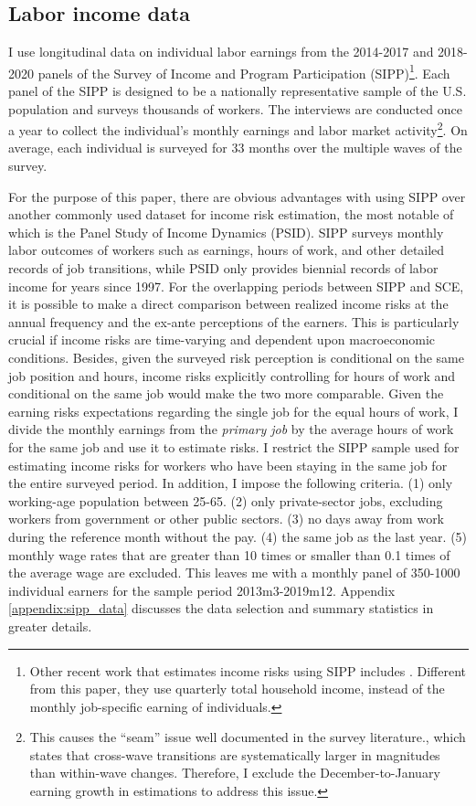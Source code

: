\subsection{Labor income data}

I use longitudinal data on individual labor earnings from the 2014-2017 and 2018-2020 panels of the Survey of Income and Program Participation (SIPP)\footnote{Other recent work that estimates income risks using SIPP includes \cite{bayer2019precautionary}. Different from this paper, they use quarterly total household income, instead of the monthly job-specific earning of individuals.}. Each panel of the SIPP is designed to be a nationally representative sample of the U.S. population and surveys thousands of workers. The interviews are conducted once a year to collect the individual's monthly earnings and labor market activity\footnote{This causes the ``seam'' issue well documented in the survey literature\citep{moore2008seam}., which states that cross-wave transitions are systematically larger in magnitudes than within-wave changes. Therefore, I exclude the December-to-January earning growth in estimations to address this issue.}. On average, each individual is surveyed for 33 months over the multiple waves of the survey.

For the purpose of this paper, there are obvious advantages with using SIPP over another commonly used dataset for income risk estimation, the most notable of which is the Panel Study of Income Dynamics (PSID). SIPP surveys monthly labor outcomes of workers such as earnings, hours of work, and other detailed records of job transitions, while PSID only provides biennial records of labor income for years since 1997. For the  overlapping periods between SIPP and SCE, it is possible to make a direct comparison between realized income risks at the annual frequency and the ex-ante perceptions of the earners. This is particularly crucial if income risks are time-varying and dependent upon macroeconomic conditions. Besides, given the surveyed risk perception is conditional on the same job position and hours, income risks explicitly controlling for hours of work and conditional on the same job would make the two more comparable.   
Given the earning risks expectations regarding the single job for the equal hours of work, I divide the monthly earnings from the \emph{primary job} by the average hours of work for the same job and use it to estimate risks. I restrict the SIPP sample used for estimating income risks for workers who have been staying in the same job for the entire surveyed period. In addition, I impose the following criteria. (1) only working-age population between 25-65. (2) only private-sector jobs, excluding workers from government or other public sectors. (3) no days away from work during the reference month without the pay. (4) the same job as the last year. (5) monthly wage rates that are greater than 10 times or smaller than 0.1 times of the average wage are excluded. This leaves me with a monthly panel of 350-1000 individual earners for the sample period 2013m3-2019m12. Appendix \ref{appendix:sipp_data} discusses the data selection and summary statistics in greater details. 